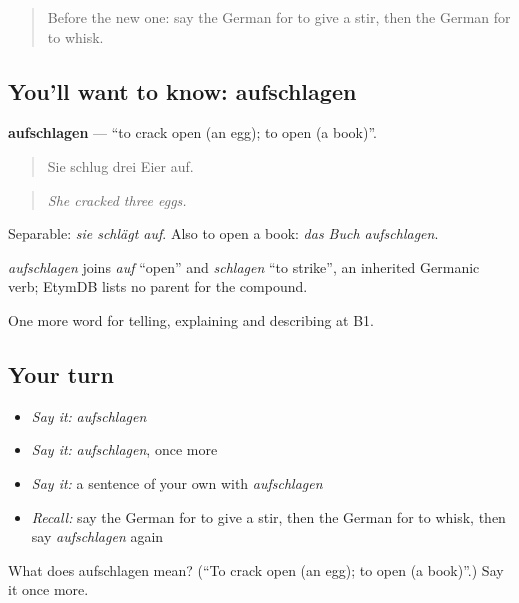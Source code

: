 \begin{quote}
Before the new one: say the German for to give a stir, then the German for to whisk.
\end{quote}

\subsection*{You'll want to know: aufschlagen}
\textbf{aufschlagen} — \textquotedblleft{}to crack open (an egg); to open (a book)\textquotedblright{}.

\begin{quote}
Sie schlug drei Eier auf.
\end{quote}

\begin{quote}
\emph{She cracked three eggs.}
\end{quote}

Separable: \emph{sie schlägt auf}. Also to open a book: \emph{das Buch aufschlagen}.

\begin{cousinweb}
\emph{aufschlagen} joins \emph{auf} \textquotedblleft{}open\textquotedblright{} and \emph{schlagen} \textquotedblleft{}to strike\textquotedblright{}, an inherited Germanic verb; EtymDB lists no parent for the compound.
\end{cousinweb}

\begin{grammarlens}[title={What you've built}]
One more word for telling, explaining and describing at B1.
\end{grammarlens}

\subsection*{Your turn}
\begin{itemize}
\raggedright
  \item \emph{Say it:} \emph{aufschlagen}
  \item \emph{Say it:} \emph{aufschlagen}, once more
  \item \emph{Say it:} a sentence of your own with \emph{aufschlagen}
  \item \emph{Recall:} say the German for to give a stir, then the German for to whisk, then say \emph{aufschlagen} again
\end{itemize}

\begin{tcolorbox}[breakable,colback=teal!4,colframe=teal!35!black,title={Before you move on}]
What does aufschlagen mean? (\textquotedblleft{}To crack open (an egg); to open (a book)\textquotedblright{}.) Say it once more.
\end{tcolorbox}
